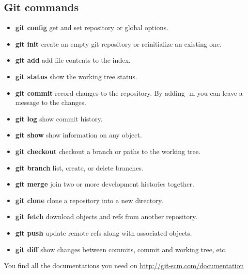 \documentclass[10pt,a4paper]{scrartcl}
\begin{document}
\subsection{Git commands}
\begin{doublespacing}
\begin{itemize}
\item{\bf{git config}} \qquad  get and set repository or global options.
\item{\bf{git init}} \qquad create an empty git repository or reinitialize an existing one.
\item{\bf{git add}} \qquad add file contents to the index.
\item{\bf{git status}} \qquad show the working tree status.
\item{\bf{git commit}} \qquad record changes to the repository. By adding -m you can leave a message to the changes.
\item{\bf{git log}} \qquad show commit history.
\item{\bf{git show}} \qquad show information on any object.
\item{\bf{git checkout}} \qquad checkout a branch or paths to the working tree.
\item{\bf{git branch}} \qquad list, create, or delete branches.
\item{\bf{git merge}} \qquad join two or more development histories together.
\item{\bf{git clone}} \qquad clone a repository into a new directory.
\item{\bf{git fetch}} \qquad download objects and refs from another repository.
\item{\bf{git push}} \qquad update remote refs along with associated objects.
\item{\bf{git diff}} \qquad show changes between commits, commit and working tree, etc.
\end{itemize}
\end{doublespacing}
\begin{singlespacing}
You find all the documentations you need on \url{http://git-scm.com/documentation}
\end{singlespacing}






\end{document}
